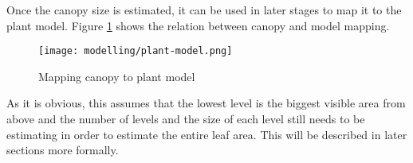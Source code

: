 Once the canopy size is estimated, it can be used in later stages to map it to the plant model.
Figure \ref{fig:canopy} shows the relation between canopy and model mapping.

\begin{figure}[H]
    \texttt{[image: modelling/plant-model.png]}
    \caption{Mapping canopy to plant model}
    \label{fig:canopy}
\end{figure}

As it is obvious, this assumes that the lowest level is the biggest visible area from above
and the number of levels and the size of each level still needs to be estimating in order to estimate the
entire leaf area.
This will be described in later sections more formally.
